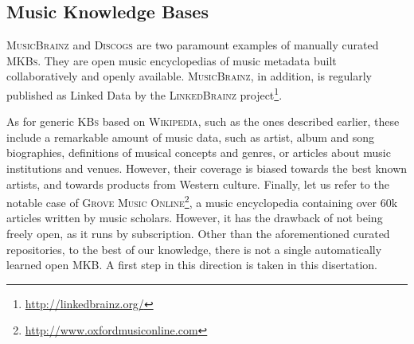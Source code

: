 
\subsection{Music Knowledge Bases}\label{sec:SOA:nlu:mkbs}

\textsc{MusicBrainz} and \textsc{Discogs} are two paramount examples of manually curated \textsc{MKBs}. They are open music encyclopedias of music metadata built collaboratively and openly available. \textsc{MusicBrainz}, in addition, is regularly published as Linked Data by the \textsc{LinkedBrainz} project\footnote{\url{http://linkedbrainz.org/}}.

As for generic \textsc{KBs} based on \textsc{Wikipedia}, such as the ones described earlier, these include a remarkable amount of music data, such as artist, album and song biographies, definitions of musical concepts and genres, or articles about music institutions and venues. However, their coverage is biased towards the best known artists, and towards products from Western culture. Finally, let us refer to the notable case of \textsc{Grove Music Online}\footnote{\url{http://www.oxfordmusiconline.com}}, a music encyclopedia containing over 60k articles written by music scholars. However, it has the drawback of not being freely open, as it runs by subscription.
Other than the aforementioned curated repositories, to the best of our knowledge, there is not a single automatically learned open \textsc{MKB}. A first step in this direction is taken in this disertation.

